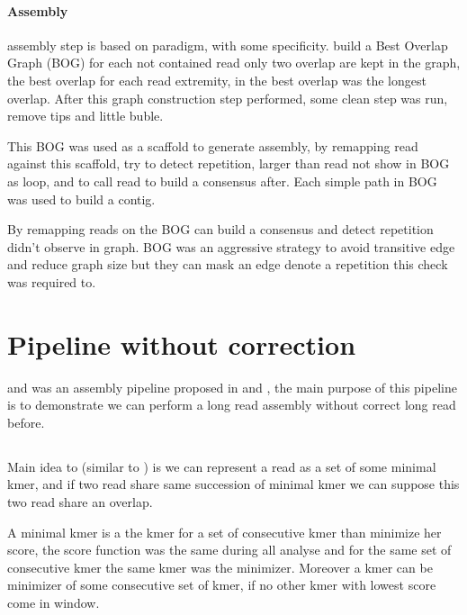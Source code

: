 \documentclass[main]{subfiles}
\begin{document}
\paragraph{Assembly}

\canu assembly step is based on \OLC paradigm, with some specificity. \canu build a Best Overlap Graph (BOG) for each not contained read only two overlap are kept in the graph, the best overlap for each read extremity, in \canu the best overlap was the longest overlap. After this graph construction step performed, some clean step was run, remove tips and little buble.

This BOG was used as a scaffold to generate assembly, by remapping read against this scaffold, \canu try to detect repetition, larger than read not show in BOG as loop, and to call read to build a consensus after. Each simple path in BOG was used to build a contig. 

By remapping reads on the BOG \canu can build a consensus and detect repetition didn't observe in graph. BOG was an aggressive strategy to avoid transitive edge and reduce graph size but they can mask an edge denote a repetition this check was required to.


\section{Pipeline without correction \miniasm} \label{section:sota:miniasm}

\minimap and \miniasm was an assembly pipeline proposed in \cite{miniasm_minimap} and \cite{minimap2}, the main purpose of this pipeline is to demonstrate we can perform a long read assembly without correct long read before.

\subsection{\minimap}

Main idea to \minimap (similar to \mhap) is we can represent a read as a set of some minimal kmer, and if two read share same succession of minimal kmer we can suppose this two read share an overlap.

A minimal kmer is a the kmer for a set of consecutive kmer than minimize her score, the score function was the same during all analyse and for the same set of consecutive kmer the same kmer was the minimizer. Moreover a kmer can be minimizer of some consecutive set of kmer, if no other kmer with lowest score come in window. 
\end{document}
